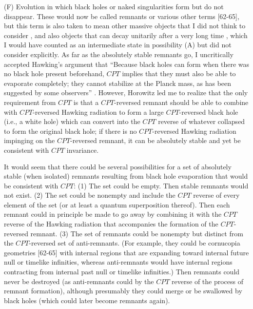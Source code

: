 \documentclass[12pt]{article}
\begin{document}
     (F) Evolution in which black holes or naked singularities form
but do not
disappear.  These would now be called remnants or various other terms
[62-65], but this term is also taken to mean other
massive
objects that I did not think to consider \cite{Gid92}, and also
objects that
can decay unitarily after a very long time \cite{ACN,Pre92}, which I
would
have
counted as an intermediate state in possibility (A) but did not
consider
explicitly.  As far as the absolutely stable remnants go, I
uncritically
accepted Hawking's argument that ``Because black holes can form when
there was
no black hole present beforehand, $CPT$ implies that they must also
be able to
evaporate completely; they cannot stabilize at the Planck mass, as
has been
suggested by some observers'' \cite{Haw76,HawHay}.  However,
Horowitz \cite{Hor93pri}
led me to realize that the only requirement from $CPT$ is that a
$CPT$-reversed
remnant should be able to combine with $CPT$-reversed Hawking
radiation to form
a large $CPT$-reversed black hole (i.e., a white hole) which can
convert into
the $CPT$ reverse of whatever collapsed to form the original black
hole; if
there is no $CPT$-reversed Hawking radiation impinging on the
$CPT$-reversed
remnant, it can be absolutely stable and yet be consistent with $CPT$
invariance.

     It would seem that there could be several possibilities for a
set of
absolutely
stable (when isolated) remnants resulting from black hole evaporation
that
would be consistent with $CPT$:  (1) The set could be empty.  Then
stable
remnants would not exist.  (2) The set could be nonempty and include
the
$CPT$ reverse of every element of the set (or at least a quantum
superposition
thereof).  Then each remnant could in principle be made to go away by
combining it with the $CPT$ reverse of the Hawking radiation that
accompanies the formation of the $CPT$-reversed remnant.  (3) The set
of remnants could be nonempty but distinct from the $CPT$-reversed
set of anti-remnants.  (For example, they could be cornucopia
geometries
[62-65]
with internal regions that are expanding toward internal future null
or
timelike
infinities, whereas anti-remnants would have internal regions
contracting from
internal past null or timelike infinities.) Then remnants could never
be
destroyed
(as anti-remnants could by the $CPT$ reverse of the process
of remnant formation), although presumably they could merge
or be swallowed by black holes (which could later become
remnants again).
\end{document}
